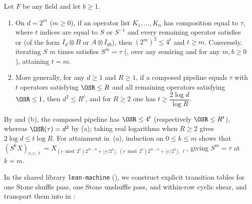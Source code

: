 \begin{theorem}\label{thm:osr-pass}
Let $F$ be any field and let $b \ge 1$.
\begin{enumerate}[label=(\alph*)]
\item On $d = 2^m$ ($m \ge 0$), if an operator list $K_1, \dots, K_n$ has composition
   equal to $\tau$, where $t$ indices are equal to $S$ or $S^{-1}$
  and every remaining operator satisfies  or 
  (of the form $I_d \otimes B$ or $A \otimes I_{db}$), then $(2^m)^2 \le 4^t$ and $t \ge m$.
  Conversely, iterating $S$ $m$ times satisfies $S^m = \tau$ (,
  over any semiring and for any $m, b \ge 0$), attaining $t = m$.
\item More generally, for any $d \ge 1$ and $R \ge 1$, if a composed pipeline equals $\tau$ with $t$
  operators satisfying $\OSR \le R$ and all remaining operators satisfying $\OSR \le 1$, then
  $d^2 \le R^t$, and for $R \ge 2$ one has $t \ge \dfrac{2\log d}{\log R}$.
\end{enumerate}
\end{theorem}
\begin{outline}
By  and (b), the composed pipeline has $\OSR \le 4^t$
(respectively $\OSR \le R^t$), whereas $\OSR(\tau) = d^2$ by (a); taking real
logarithms when $R \ge 2$ gives $2\log d \le t\log R$. For attainment in~(a), induction on
$0 \le k \le m$ shows that $(S^k X)_{r,c,\ell} = X_{(c \bmod 2^k)2^{m-k} + \lfloor r/2^k\rfloor,\,
(r \bmod 2^k)2^{m-k} + \lfloor c/2^k\rfloor,\,\ell}$, giving $S^m = \tau$ at $k = m$.
\end{outline}

In the shared library \texttt{lean-machine} (), we construct
explicit transition tables for one Stone shuffle pass, one Stone unshuffle pass, and within-row
cyclic shear, and transport them into  in :

